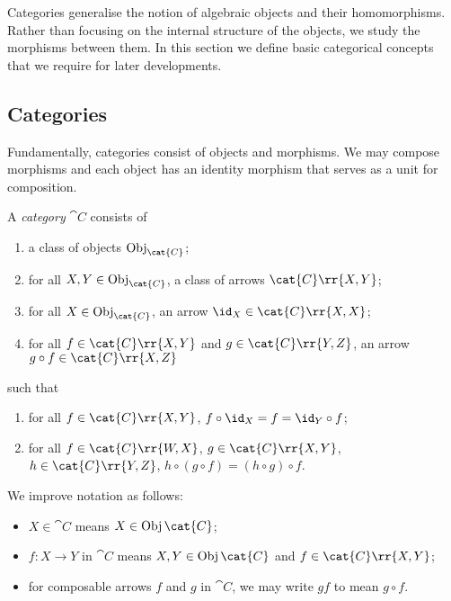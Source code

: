 \documentclass{article}
\begin{document}
Categories generalise the notion of algebraic objects and their homomorphisms.
Rather than focusing on the internal structure of the objects, we study the
morphisms between them. In this section we define basic categorical concepts that
we require for later developments.

\subsection{Categories}

Fundamentally, categories consist of objects and morphisms. We may compose morphisms
and each object has an identity morphism that serves as a unit for composition.

\begin{definition}\label{def:category}
  A \emph{category} $\cat C$ consists of
  \begin{enumerate}
    \item a class of objects $\Obj_{\cat{C}}$;
    \item for all $X,Y\in\Obj_{\cat{C}}$, a class of arrows $\cat{C}\rr{X,Y}$;
    \item for all $X\in\Obj_{\cat{C}}$, an arrow $\id_X\in\cat{C}\rr{X,X}$;
    \item for all $f\in\cat{C}\rr{X,Y}$ and $g\in\cat{C}\rr{Y,Z}$, an arrow
      $g\circ f\in\cat{C}\rr{X,Z}$
  \end{enumerate}
  such that
  \begin{enumerate}
    \item for all $f\in\cat{C}\rr{X,Y}$, $f\circ \id_X = f = \id_Y\circ f$;
    \item for all $f\in\cat{C}\rr{W,X}$, $g\in\cat{C}\rr{X,Y}$, $h\in\cat{C}\rr{Y,Z}$,
      $h\circ(g\circ f)=(h\circ g)\circ f$.
  \end{enumerate}
\end{definition}

\begin{notation}
  We improve notation as follows:
  \begin{itemize}
    \item $X\in\cat{C}$ means $X\in\Obj\cat{C}$;
    \item $f:X\to Y$ in $\cat{C}$ means $X,Y\in\Obj\cat{C}$ and $f\in\cat{C}\rr{X,Y}$;
    \item for composable arrows $f$ and $g$ in $\cat{C}$, we may write $gf$ to mean $g\circ f$.
  \end{itemize}
\end{notation}
\end{document}
